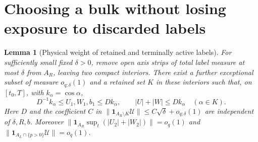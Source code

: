 \documentclass[11pt]{article}
\newtheorem{lemma}{Lemma}
\begin{document}
\section{Choosing a bulk without losing exposure to discarded labels}\label{an04ce5v2:retained}
\begin{lemma}[Physical weight of retained and terminally active labels]\label{an04ce5v2:bulklemma}
For sufficiently small fixed $\delta>0$, remove open axis strips of total label measure at most $\delta$ from $A_R$, leaving two compact interiors. There exist a further exceptional subset of measure $o_{q;\delta}(1)$ and a retained set $K$ in these interiors such that, on $[t_0,T]$, with $k_\alpha=\cos\alpha$,
\begin{equation}\label{an04ce5v2:bulk}
 D^{-1}k_\alpha\le U_1,W_1,b_1\le D k_\alpha,\qquad |U|+|W|\le Dk_\alpha
 \quad(\alpha\in K).
\end{equation}
Here $D$ and the coefficient $C$ in $\|\mathbf1_{A_R\setminus K}\mathcal U\|\le C\sqrt\delta+o_{q;\delta}(1)$ are independent of $\delta,R,b$. Moreover $\|\mathbf1_{A_R}\sup_t(|U_2|+|W_2|)\|=o_q(1)$ and $\|\mathbf1_{A_L\cap\{p>0\}}\mathcal U\|=o_q(1)$.
\end{lemma}
\end{document}
